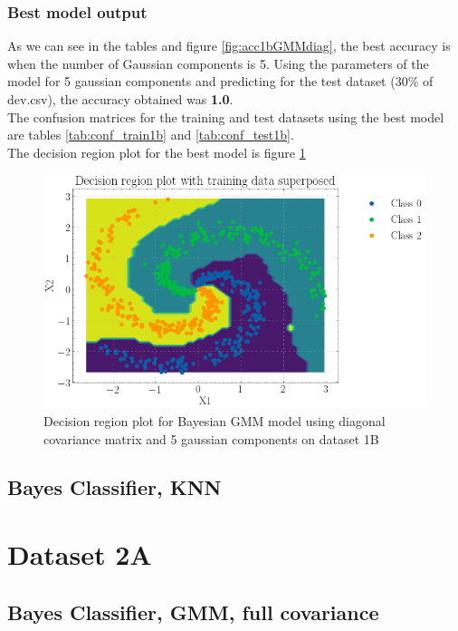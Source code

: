 \documentclass[11pt,a4paper]{article}
\begin{document}
\subsubsection{Best model output}
As we can see in the tables and figure \ref{fig:acc1bGMMdiag}, the best accuracy is when the number of Gaussian components is 5. Using the parameters of the model for 5 gaussian components and predicting for the test dataset (30\% of dev.csv), the accuracy obtained was \textbf{1.0}.\\
The confusion matrices for the training and test datasets using the best model are tables \ref{tab:conf_train1b} and \ref{tab:conf_test1b}.\\



The decision region plot for the best model is figure \ref{fig:dec1bGMMdiag}
\begin{figure}[H]
    \centering
    \includegraphics[scale = 0.5]{images/decisionReg_ds2.png}
    \caption{Decision region plot for Bayesian GMM model using diagonal covariance matrix and 5 gaussian components on dataset 1B}
    \label{fig:dec1bGMMdiag}
\end{figure}

\subsection{Bayes Classifier, KNN}

\break
\section{Dataset 2A}
\subsection{Bayes Classifier, GMM, full covariance}
\end{document}
